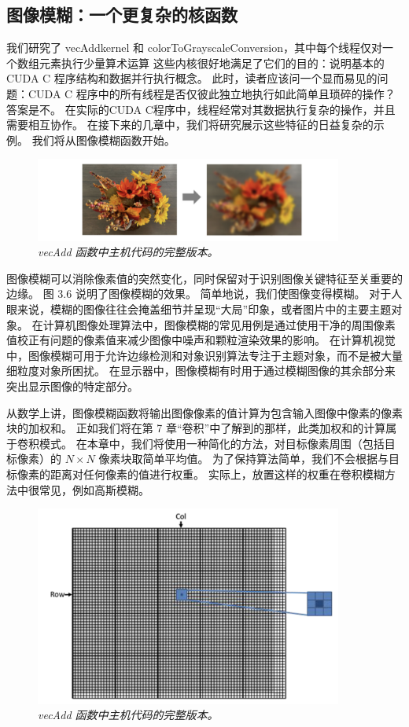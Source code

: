 \subsection{图像模糊：一个更复杂的核函数}
我们研究了 vecAddkernel 和 colorToGrayscaleConversion，其中每个线程仅对一个数组元素执行少量算术运算
这些内核很好地满足了它们的目的：说明基本的 CUDA C 程序结构和数据并行执行概念。 
此时，读者应该问一个显而易见的问题：CUDA C 程序中的所有线程是否仅彼此独立地执行如此简单且琐碎的操作？ 答案是不。 
在实际的CUDA C程序中，线程经常对其数据执行复杂的操作，并且需要相互协作。 
在接下来的几章中，我们将研究展示这些特征的日益复杂的示例。 我们将从图像模糊函数开始。

\begin{figure}[H]
	\centering
	\includegraphics[width=0.9\textwidth]{figs/F3.6.png}
	\caption{\textit{\color{red} vecAdd 函数中主机代码的完整版本。}}
\end{figure}

图像模糊可以消除像素值的突然变化，同时保留对于识别图像关键特征至关重要的边缘。 图 3.6 说明了图像模糊的效果。 
简单地说，我们使图像变得模糊。 对于人眼来说，模糊的图像往往会掩盖细节并呈现“大局”印象，或者图片中的主要主题对象。 
在计算机图像处理算法中，图像模糊的常见用例是通过使用干净的周围像素值校正有问题的像素值来减少图像中噪声和颗粒渲染效果的影响。 
在计算机视觉中，图像模糊可用于允许边缘检测和对象识别算法专注于主题对象，而不是被大量细粒度对象所困扰。 
在显示器中，图像模糊有时用于通过模糊图像的其余部分来突出显示图像的特定部分。

从数学上讲，图像模糊函数将输出图像像素的值计算为包含输入图像中像素的像素块的加权和。 
正如我们将在第 7 章“卷积”中了解到的那样，此类加权和的计算属于卷积模式。 
在本章中，我们将使用一种简化的方法，对目标像素周围（包括目标像素）的 $N \times N$ 像素块取简单平均值。 
为了保持算法简单，我们不会根据与目标像素的距离对任何像素的值进行权重。 
实际上，放置这样的权重在卷积模糊方法中很常见，例如高斯模糊。

\begin{figure}[H]
	\centering
	\includegraphics[width=0.9\textwidth]{figs/F3.7.png}
	\caption{\textit{\color{red} vecAdd 函数中主机代码的完整版本。}}
\end{figure}

